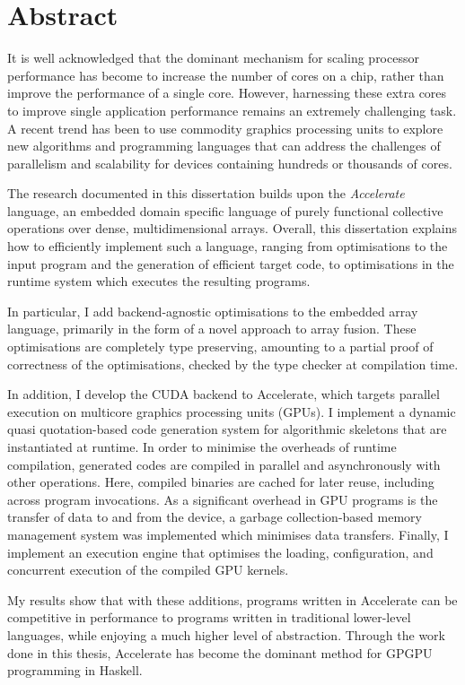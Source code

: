 
\chapter{Abstract}

It is well acknowledged that the dominant mechanism for scaling processor
performance has become to increase the number of cores on a chip, rather than
improve the performance of a single core. However, harnessing these extra cores
to improve single application performance remains an extremely challenging task.
A recent trend has been to use commodity graphics processing units to explore
new algorithms and programming languages that can address the challenges of
parallelism and scalability for devices containing hundreds or thousands of
cores.

The research documented in this dissertation builds upon the \emph{Accelerate}
language, an embedded domain specific language of purely functional collective
operations over dense, multidimensional arrays. Overall, this dissertation
explains how to efficiently implement such a language, ranging from
optimisations to the input program and the generation of efficient target code,
to optimisations in the runtime system which executes the resulting programs.

In particular, I add backend-agnostic optimisations to the embedded array
language, primarily in the form of a novel approach to array fusion. These
optimisations are completely type preserving, amounting to a partial proof of
correctness of the optimisations, checked by the type checker at compilation
time.

In addition, I develop the CUDA backend to Accelerate, which targets parallel
execution on multicore graphics processing units (GPUs). I implement a dynamic
quasi quotation-based code generation system for algorithmic skeletons that are
instantiated at runtime. In order to minimise the overheads of runtime
compilation, generated codes are compiled in parallel and asynchronously with
other operations. Here, compiled binaries are cached for later reuse, including
across program invocations. As a significant overhead in GPU programs is the
transfer of data to and from the device, a garbage collection-based memory
management system was implemented which minimises data transfers. Finally, I
implement an execution engine that optimises the loading, configuration, and
concurrent execution of the compiled GPU kernels.

My results show that with these additions, programs written in Accelerate can
be competitive in performance to programs written in traditional lower-level
languages, while enjoying a much higher level of abstraction. Through the work
done in this thesis, Accelerate has become the dominant method for GPGPU
programming in Haskell.


